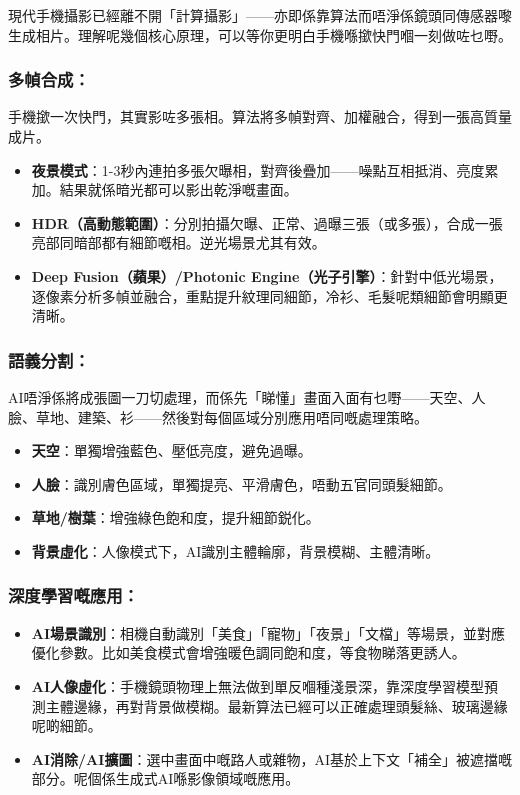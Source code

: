 
現代手機攝影已經離不開「計算攝影」——亦即係靠算法而唔淨係鏡頭同傳感器嚟生成相片。理解呢幾個核心原理，可以等你更明白手機喺撳快門嗰一刻做咗乜嘢。

\subsubsection*{多幀合成：}

手機撳一次快門，其實影咗多張相。算法將多幀對齊、加權融合，得到一張高質量成片。

\begin{itemize}
  \item \textbf{夜景模式}：1-3秒內連拍多張欠曝相，對齊後疊加——噪點互相抵消、亮度累加。結果就係暗光都可以影出乾淨嘅畫面。
  \item \textbf{HDR（高動態範圍）}：分別拍攝欠曝、正常、過曝三張（或多張），合成一張亮部同暗部都有細節嘅相。逆光場景尤其有效。
  \item \textbf{Deep Fusion（蘋果）/Photonic Engine（光子引擎）}：針對中低光場景，逐像素分析多幀並融合，重點提升紋理同細節，冷衫、毛髮呢類細節會明顯更清晰。
\end{itemize}

\subsubsection*{語義分割：}

AI唔淨係將成張圖一刀切處理，而係先「睇懂」畫面入面有乜嘢——天空、人臉、草地、建築、衫——然後對每個區域分別應用唔同嘅處理策略。

\begin{itemize}
  \item \textbf{天空}：單獨增強藍色、壓低亮度，避免過曝。
  \item \textbf{人臉}：識別膚色區域，單獨提亮、平滑膚色，唔動五官同頭髮細節。
  \item \textbf{草地/樹葉}：增強綠色飽和度，提升細節鋭化。
  \item \textbf{背景虛化}：人像模式下，AI識別主體輪廓，背景模糊、主體清晰。
\end{itemize}

\subsubsection*{深度學習嘅應用：}

\begin{itemize}
  \item \textbf{AI場景識別}：相機自動識別「美食」「寵物」「夜景」「文檔」等場景，並對應優化參數。比如美食模式會增強暖色調同飽和度，等食物睇落更誘人。
  \item \textbf{AI人像虛化}：手機鏡頭物理上無法做到單反嗰種淺景深，靠深度學習模型預測主體邊緣，再對背景做模糊。最新算法已經可以正確處理頭髮絲、玻璃邊緣呢啲細節。
  \item \textbf{AI消除/AI擴圖}：選中畫面中嘅路人或雜物，AI基於上下文「補全」被遮擋嘅部分。呢個係生成式AI喺影像領域嘅應用。
\end{itemize}


